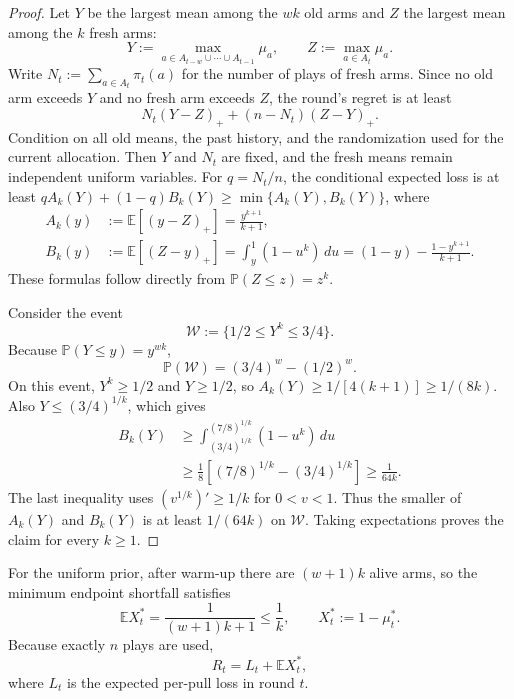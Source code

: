 \documentclass[11pt,letterpaper]{article}
\numberwithin{equation}{section}
\theoremstyle{definition}
\theoremstyle{remark}
\newcommand{\E}{\mathbb{E}}
\newcommand{\Pp}{\mathbb{P}}
\newcommand{\1}{\mathbf{1}}
\begin{document}
\begin{proof}
Let $Y$ be the largest mean among the $wk$ old arms and $Z$ the
largest mean among the $k$ fresh arms:
\[
  Y:=\max_{a\in A_{t-w}\cup\cdots\cup A_{t-1}}\mu_a,
  \qquad Z:=\max_{a\in A_t}\mu_a.
\]
Write $N_t:=\sum_{a\in A_t}\pi_t(a)$ for the number of plays of fresh arms.
Since no old arm exceeds $Y$ and no fresh arm exceeds $Z$, the
round's regret is at least
\begin{equation}\label{eq:pathwise-arrival}
  N_t(Y-Z)_+ +(n-N_t)(Z-Y)_+.
\end{equation}
Condition on all old means, the past history, and the randomization
used for the current allocation. Then $Y$ and $N_t$ are fixed, and
the fresh means remain independent uniform variables.
For $q=N_t/n$, the conditional expected loss is at least
$qA_k(Y)+(1-q)B_k(Y)\ge\min\{A_k(Y),B_k(Y)\}$, where
\begin{align}
  A_k(y)&:=\E[(y-Z)_+]=\frac{y^{k+1}}{k+1}, \label{eq:Ak}\\
  B_k(y)&:=\E[(Z-y)_+]
       =\int_y^1(1-u^k)\,du
       =(1-y)-\frac{1-y^{k+1}}{k+1}. \label{eq:Bk}
\end{align}
These formulas follow directly from $\Pp(Z\le z)=z^k$.

Consider the event
\[
  \mathcal W:=\{1/2\le Y^k\le3/4\}.
\]
Because $\Pp(Y\le y)=y^{wk}$,
\[
  \Pp(\mathcal W)=(3/4)^w-(1/2)^w.
\]
On this event, $Y^k\ge1/2$ and $Y\ge1/2$, so
$A_k(Y)\ge1/[4(k+1)]\ge1/(8k)$. Also
$Y\le(3/4)^{1/k}$, which gives
\begin{align*}
  B_k(Y)
  &\ge\int_{(3/4)^{1/k}}^{(7/8)^{1/k}}(1-u^k)\,du\\
  &\ge\frac18\left[(7/8)^{1/k}-(3/4)^{1/k}\right]
   \ge\frac{1}{64k}.
\end{align*}
The last inequality uses $(v^{1/k})'\ge1/k$ for $0<v<1$.
Thus the smaller of $A_k(Y)$ and $B_k(Y)$ is at least $1/(64k)$
on $\mathcal W$.
Taking expectations proves the claim for every $k\ge1$.
\end{proof}

For the uniform prior, after warm-up there are $(w+1)k$ alive arms, so the
minimum endpoint shortfall satisfies
\begin{equation}\label{eq:best-endpoint}
  \E X_t^*=\frac{1}{(w+1)k+1}\le\frac{1}{k},
  \qquad
  X_t^*:=1-\mu_t^*.
\end{equation}
Because exactly $n$ plays are used,
\begin{equation}\label{eq:R-L-relation}
  R_t=L_t+\E X_t^*,
\end{equation}
where $L_t$ is the expected per-pull loss in round $t$.
\end{document}
